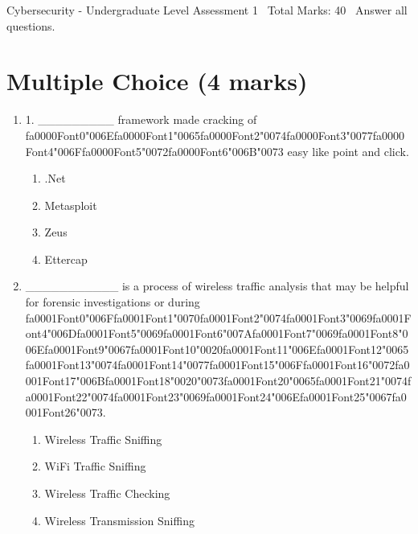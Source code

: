 \documentclass[12pt]{article}
\begin{document}
\begin{center}
Cybersecurity - Undergraduate Level Assessment 1 \
Total Marks: 40 \
Answer all questions.
\end{center}

\section*{Multiple Choice (4 marks)}
\begin{enumerate}[label=\arabic*.]
\item 1. \_\_\_\_\_\_\_\_\_ framework made cracking of {\csname fa0000Font0\endcsname\char"006E}{\csname fa0000Font1\endcsname\char"0065}{\csname fa0000Font2\endcsname\char"0074}{\csname fa0000Font3\endcsname\char"0077}{\csname fa0000Font4\endcsname\char"006F}{\csname fa0000Font5\endcsname\char"0072}{\csname fa0000Font6\endcsname\char"006B}{\char"0073} easy like point and click.
\begin{enumerate}[label=(\alph*)]
    \item .Net
    \item Metasploit
    \item Zeus
    \item Ettercap
\end{enumerate}
\item \_\_\_\_\_\_\_\_\_\_\_ is a process of wireless traffic analysis that may be helpful for forensic investigations or during {\csname fa0001Font0\endcsname\char"006F}{\csname fa0001Font1\endcsname\char"0070}{\csname fa0001Font2\endcsname\char"0074}{\csname fa0001Font3\endcsname\char"0069}{\csname fa0001Font4\endcsname\char"006D}{\csname fa0001Font5\endcsname\char"0069}{\csname fa0001Font6\endcsname\char"007A}{\csname fa0001Font7\endcsname\char"0069}{\csname fa0001Font8\endcsname\char"006E}{\csname fa0001Font9\endcsname\char"0067}{\csname fa0001Font10\endcsname\char"0020}{\csname fa0001Font11\endcsname\char"006E}{\csname fa0001Font12\endcsname\char"0065}{\csname fa0001Font13\endcsname\char"0074}{\csname fa0001Font14\endcsname\char"0077}{\csname fa0001Font15\endcsname\char"006F}{\csname fa0001Font16\endcsname\char"0072}{\csname fa0001Font17\endcsname\char"006B}{\csname fa0001Font18\endcsname\char"0020}{\char"0073}{\csname fa0001Font20\endcsname\char"0065}{\csname fa0001Font21\endcsname\char"0074}{\csname fa0001Font22\endcsname\char"0074}{\csname fa0001Font23\endcsname\char"0069}{\csname fa0001Font24\endcsname\char"006E}{\csname fa0001Font25\endcsname\char"0067}{\csname fa0001Font26\endcsname\char"0073}.
\begin{enumerate}[label=(\alph*)]
    \item Wireless Traffic Sniffing
    \item WiFi Traffic Sniffing
    \item Wireless Traffic Checking
    \item Wireless Transmission Sniffing
\end{enumerate}
\end{enumerate}
\end{document}
